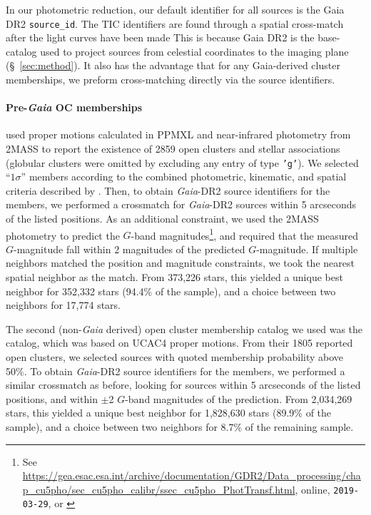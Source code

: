 \documentclass[12pt,twocolumn,tighten]{aastex62}
\begin{document}
In our photometric reduction,  our default identifier for all sources
is the Gaia DR2 \texttt{source\_id}.
The TIC identifiers are found through a spatial cross-match after the light 
curves have been made
\citep{stassun_TIC_2018,stassun_TIC8_2019}
This is because Gaia DR2 is the base-catalog used to project
sources from celestial coordinates to the imaging plane (\S~\ref{sec:method}).
It also has the advantage that for any Gaia-derived cluster memberships, 
we preform cross-matching directly via the source identifiers.



\paragraph{Pre-{\it Gaia} OC memberships}
\citet{Kharchenko_et_al_2013} used proper motions calculated in PPMXL
\citep[][a combination of USNO-B1{.}0 and 2MASS
astrometry]{roeser_ppmxl_2010} and near-infrared photometry from 2MASS
\citep{skrutskie_tmass_2006} to report the existence of 2859 open
clusters and stellar associations (globular clusters were
omitted by excluding any entry of type \texttt{'g'}).
We selected ``$1\sigma$'' members according to the
combined photometric, kinematic, and spatial criteria described by
\citet{kharchenko_global_2012}.  Then, to obtain {\it Gaia}-DR2 source
identifiers for the members, we performed a crossmatch for {\it
Gaia}-DR2 sources within 5 arcseconds of the listed positions.  As an
additional constraint, we used the 2MASS photometry to predict the
$G$-band magnitudes\footnote{See
\url{https://gea.esac.esa.int/archive/documentation/GDR2/Data_processing/chap_cu5pho/sec_cu5pho_calibr/ssec_cu5pho_PhotTransf.html},
online, \texttt{2019-03-29}, or \citet{carrasco_gaia_2016}}, and
required that the measured $G$-magnitude fall within 2 magnitudes of
the predicted $G$-magnitude.  If multiple neighbors matched the
position and magnitude constraints, we took the nearest spatial
neighbor as the match.  From 373{,}226 stars, this yielded a unique
best neighbor for 352{,}332 stars (94.4\% of the sample), and a choice
between two neighbors for 17{,}774 stars. 

The second (non-{\it Gaia} derived) open cluster membership catalog we
used was the \citet{dias_proper_2014} catalog, which was based on
UCAC4 proper motions.
From their 1805 reported open clusters, we selected sources with
quoted membership probability above 50\%.
To obtain {\it Gaia}-DR2 source identifiers for the members, we
performed a similar crossmatch as before, looking for sources within 5
arcseconds of the listed positions, and within $\pm$2 $G$-band
magnitudes of the prediction.
From 2{,}034{,}269 stars, this yielded a unique
best neighbor for 1{,}828{,}630 stars (89.9\% of the sample), and a choice
between two neighbors for 8.7\% of the remaining sample. 
\end{document}
